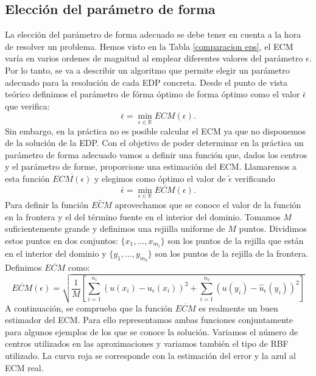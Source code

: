 \documentclass[11pt,a4paper]{article}
\begin{document}
\subsection{Elección del parámetro de forma}
La elección del parámetro de forma adecuado se debe tener en cuenta a la hora de resolver un problema. Hemos visto en la Tabla \ref{comparacion eps}, el ECM varía en varios ordenes de magnitud al emplear diferentes valores del parámetro $\epsilon$. Por lo tanto, se va a describir un algoritmo que permite elegir un parámetro adecuado para la resolución de cada EDP concreta. Desde el punto de vista teórico definimos el parámetro de fórma óptimo de forma óptimo como el valor $\bar{\epsilon}$ que verifica:
$$\bar{\epsilon}=\displaystyle\min_{\epsilon\in \mathbb{R}} ECM(\epsilon).$$
Sin embargo, en la práctica no es posible calcular el ECM ya que no disponemos de la solución de la EDP. Con el objetivo de poder determinar en la práctica un parámetro de forma adecuado vamos a definir una función que, dados los centros y el parámetro de forme, proporcione una estimación del ECM. Llamaremos a esta función $\overline{ECM(\epsilon)}$ y elegimos como óptimo el valor de $\tilde{\epsilon}$ verificando 
$$\bar{\epsilon}=\displaystyle\min_{\epsilon\in \mathbb{R}} \overline{ECM}(\epsilon).$$
Para definir la función $\tilde{ECM}$ aprovechamos que se conoce el valor de la función en la frontera y el del término fuente en el interior del dominio. Tomamos $M$ suficientemente grande y definimos una rejiilla uniforme de $M$ puntos. Dividimos estos puntos en dos conjuntos: $\lbrace x_1,\ldots,x_{m_i}\rbrace$ son los puntos de la rejilla que están en el interior del dominio y $\lbrace y_1,\ldots,y_{m_b}\rbrace$ son los puntos de la rejilla de la frontera. Definimos $\overline{ECM}$ como: 
$$\overline{ECM}(\epsilon)=\sqrt{\frac{1}{M}\left[ \displaystyle \sum_{i=1}^{n_i} (u(x_i)-\hat{u}_\epsilon (x_i))^2+\displaystyle \sum_{i=1}^{n_b} (u(y_i)-\hat{u}_\epsilon (y_i))^2\right]}$$
A continuación, se comprueba que la función $\overline{ECM}$ es realmente un buen estimador del ECM. Para ello representamos ambas funciones conjuntamente para algunos ejemplos de los que se conoce la solución. Variamos el número de centros utilizados en las aproximaciones y variamos también el tipo de RBF utilizado. La curva roja se corresponde con la estimación del error y la azul al ECM real. 
\end{document}
